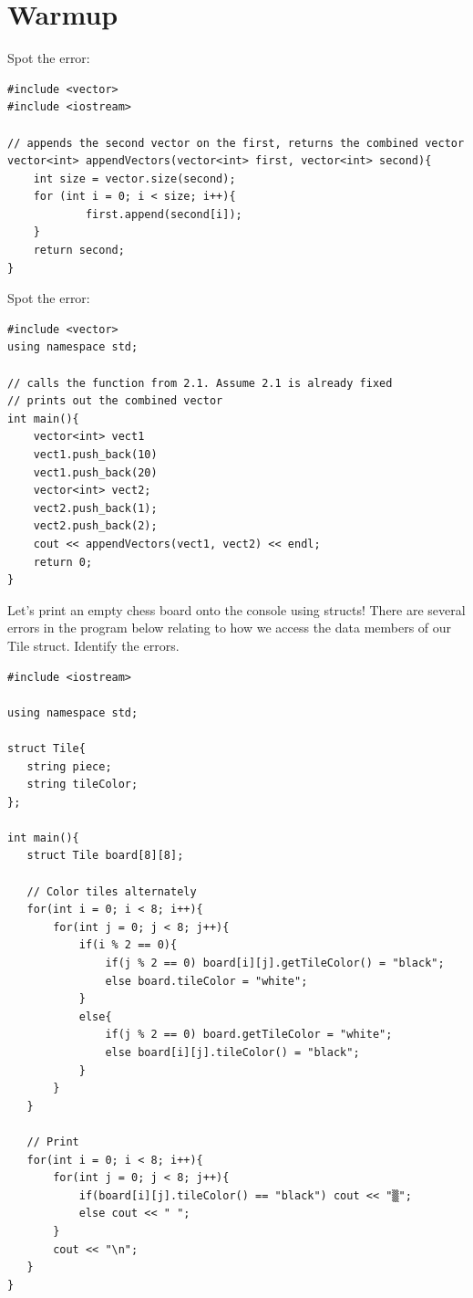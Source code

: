 \section{Warmup}

\problem Spot the error:

\begin{verbatim}
#include <vector>
#include <iostream>

// appends the second vector on the first, returns the combined vector
vector<int> appendVectors(vector<int> first, vector<int> second){
    int size = vector.size(second);
    for (int i = 0; i < size; i++){
            first.append(second[i]);
    }
    return second;
}
\end{verbatim}

\problem Spot the error: 

\begin{verbatim}
#include <vector>
using namespace std;

// calls the function from 2.1. Assume 2.1 is already fixed
// prints out the combined vector
int main(){
    vector<int> vect1
    vect1.push_back(10)
    vect1.push_back(20)
    vector<int> vect2;
    vect2.push_back(1);
    vect2.push_back(2);
    cout << appendVectors(vect1, vect2) << endl;
    return 0;
}
\end{verbatim}

\problem  Let’s print an empty chess board onto the console using structs! There are several errors in the program below relating to how we access the data members of our Tile struct. Identify the errors. 

\begin{verbatim}
#include <iostream>
 
using namespace std;
 
struct Tile{
   string piece;
   string tileColor;
};
 
int main(){
   struct Tile board[8][8];
 
   // Color tiles alternately
   for(int i = 0; i < 8; i++){
       for(int j = 0; j < 8; j++){
           if(i % 2 == 0){
               if(j % 2 == 0) board[i][j].getTileColor() = "black";
               else board.tileColor = "white";
           }
           else{
               if(j % 2 == 0) board.getTileColor = "white";
               else board[i][j].tileColor() = "black";
           }
       }
   }
 
   // Print
   for(int i = 0; i < 8; i++){
       for(int j = 0; j < 8; j++){
           if(board[i][j].tileColor() == "black") cout << "▒";
           else cout << " ";
       }
       cout << "\n";
   }
}
\end{verbatim}

